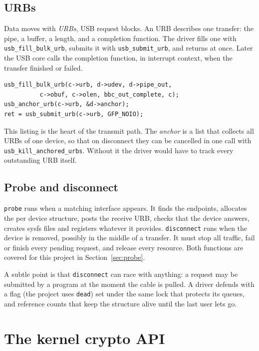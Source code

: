 \documentclass[11pt,a4paper,oneside]{report}
\newcommand{\code}[1]{\texttt{\small #1}}
\begin{document}
\section{URBs}

Data moves with \emph{URBs}, USB request blocks. An URB describes one transfer: the pipe, a buffer, a length, and a completion function. The driver fills one with \code{usb\_fill\_bulk\_urb}, submits it with \code{usb\_submit\_urb}, and returns at once. Later the USB core calls the completion function, in interrupt context, when the transfer finished or failed.

\begin{lstlisting}
usb_fill_bulk_urb(c->urb, d->udev, d->pipe_out,
		  c->obuf, c->olen, bbc_out_complete, c);
usb_anchor_urb(c->urb, &d->anchor);
ret = usb_submit_urb(c->urb, GFP_NOIO);
\end{lstlisting}

This listing is the heart of the transmit path. The \emph{anchor} is a list that collects all URBs of one device, so that on disconnect they can be cancelled in one call with \code{usb\_kill\_anchored\_urbs}. Without it the driver would have to track every outstanding URB itself.

\section{Probe and disconnect}

\code{probe} runs when a matching interface appears. It finds the endpoints, allocates the per device structure, posts the receive URB, checks that the device answers, creates sysfs files and registers whatever it provides. \code{disconnect} runs when the device is removed, possibly in the middle of a transfer. It must stop all traffic, fail or finish every pending request, and release every resource. Both functions are covered for this project in Section~\ref{sec:probe}.

A subtle point is that \code{disconnect} can race with anything: a request may be submitted by a program at the moment the cable is pulled. A driver defends with a flag (the project uses \code{dead}) set under the same lock that protects its queues, and reference counts that keep the structure alive until the last user lets go.



\chapter{The kernel crypto API}\label{ch:crypto}
\end{document}
